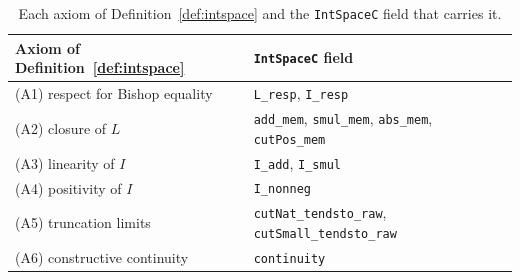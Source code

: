 \documentclass[11pt]{article}
\theoremstyle{definition}
\theoremstyle{remark}
\begin{document}
\begin{table}[htbp]
\centering\small
\caption{Each axiom of Definition~\ref{def:intspace} and the \texttt{IntSpaceC} field that carries it.}
\label{tab:axiomfields}
\begin{tabular}{ll}
\hline
Axiom of Definition~\ref{def:intspace} & \texttt{IntSpaceC} field \\
\hline
(A1) respect for Bishop equality & \texttt{L\_resp}, \texttt{I\_resp} \\
(A2) closure of $L$ & \texttt{add\_mem}, \texttt{smul\_mem}, \texttt{abs\_mem}, \texttt{cutPos\_mem} \\
(A3) linearity of $I$ & \texttt{I\_add}, \texttt{I\_smul} \\
(A4) positivity of $I$ & \texttt{I\_nonneg} \\
(A5) truncation limits & \texttt{cutNat\_tendsto\_raw}, \texttt{cutSmall\_tendsto\_raw} \\
(A6) constructive continuity & \texttt{continuity} \\
\hline
\end{tabular}
\end{table}

\medskip
\end{document}
